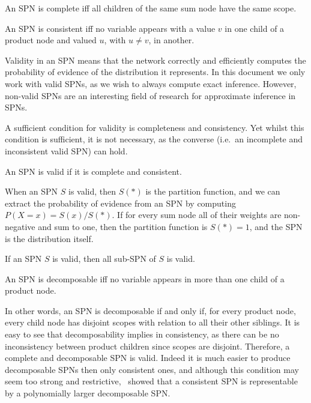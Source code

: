 \begin{definition}[Completeness]
  An SPN is complete iff all children of the same sum node have the same scope.
\end{definition}

\begin{definition}[Consistency]
  An SPN is consistent iff no variable appears with a value $v$ in one child of a product node and
  valued $u$, with $u\neq v$, in another.
\end{definition}

Validity in an SPN means that the network correctly and efficiently computes the probability of
evidence of the distribution it represents. In this document we only work with valid SPNs, as we
wish to always compute exact inference. However, non-valid SPNs are an interesting field of
research for approximate inference in SPNs.

A sufficient condition for validity is completeness and consistency. Yet whilst this condition is
sufficient, it is not necessary, as the converse (i.e.\ an incomplete and inconsistent valid SPN)
can hold.

\begin{theorem}
  An SPN is valid if it is complete and consistent.
\end{theorem}

When an SPN $S$ is valid, then $S(\ast)$ is the partition function, and we can extract the
probability of evidence from an SPN by computing $P(X=x)=S(x)/S(\ast)$. If for every sum node all
of their weights are non-negative and sum to one, then the partition function is $S(\ast)=1$, and
the SPN is the distribution itself.

\begin{corollary}
  If an SPN $S$ is valid, then all sub-SPN of $S$ is valid.
\end{corollary}

\begin{definition}[Decomposability]
  An SPN is decomposable iff no variable appears in more than one child of a product node.
\end{definition}

In other words, an SPN is decomposable if and only if, for every product node, every child node has
disjoint scopes with relation to all their other siblings. It is easy to see that decomposability
implies in consistency, as there can be no inconsistency between product children since scopes are
disjoint. Therefore, a complete and decomposable SPN is valid. Indeed it is much easier to produce
decomposable SPNs then only consistent ones, and although this condition may seem too strong and
restrictive,~\cite{theoretical-spn} showed that a consistent SPN is representable by a polynomially
larger decomposable SPN\@.

